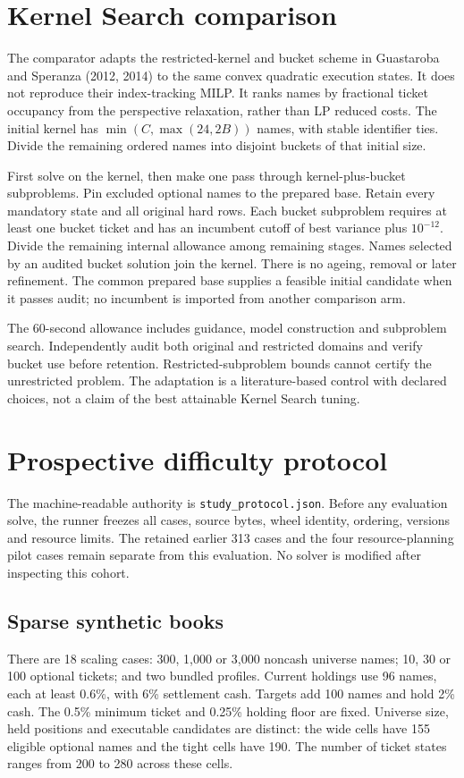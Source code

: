 \documentclass[11pt]{article}
\begin{document}
\section{Kernel Search comparison}
The comparator adapts the restricted-kernel and bucket scheme in Guastaroba
and Speranza (2012, 2014) to the same convex quadratic execution states. It
does not reproduce their index-tracking MILP. It ranks names by fractional
ticket occupancy from the perspective relaxation, rather than LP reduced
costs. The initial kernel has $\min(C,\max(24,2B))$ names, with stable
identifier ties. Divide the remaining ordered names into disjoint buckets
of that initial size.

First solve on the kernel, then make one pass through kernel-plus-bucket
subproblems. Pin excluded optional names to the prepared base. Retain every
mandatory state and all original hard rows. Each bucket subproblem requires
at least one bucket ticket and has an incumbent cutoff of best variance plus
$10^{-12}$. Divide the remaining internal allowance among remaining stages.
Names selected by an audited bucket solution join the kernel. There is no
ageing, removal or later refinement. The common prepared base supplies a
feasible initial candidate when it passes audit; no incumbent is imported
from another comparison arm.

The 60-second allowance includes guidance, model construction and subproblem
search. Independently audit both original and restricted domains and verify
bucket use before retention. Restricted-subproblem bounds cannot certify
the unrestricted problem. The adaptation is a literature-based control with
declared choices, not a claim of the best attainable Kernel Search tuning.

\section{Prospective difficulty protocol}
The machine-readable authority is \texttt{study\_protocol.json}. Before any
evaluation solve, the runner freezes all cases, source bytes, wheel identity,
ordering, versions and resource limits. The retained earlier 313 cases and
the four resource-planning pilot cases remain separate from this evaluation.
No solver is modified after inspecting this cohort.

\subsection{Sparse synthetic books}
There are 18 scaling cases: 300, 1,000 or 3,000 noncash universe names;
10, 30 or 100 optional tickets; and two bundled profiles. Current holdings
use 96 names, each at least 0.6\%, with 6\% settlement cash. Targets add 100
names and hold 2\% cash. The 0.5\% minimum ticket and 0.25\% holding floor are
fixed. Universe size, held positions and executable candidates are distinct:
the wide cells have 155 eligible optional names and the tight cells have 190.
The number of ticket states ranges from 200 to 280 across these cells.
\end{document}
